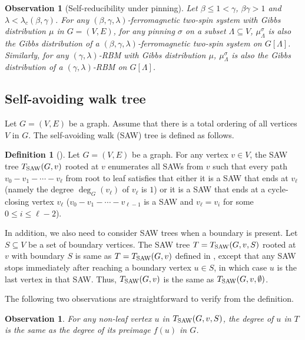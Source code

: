 \documentclass[11pt]{amsart}
\newtheorem{observation}[theorem]{Observation}
\theoremstyle{definition}
\newtheorem{definition}[theorem]{Definition}
\theoremstyle{remark}
\begin{document}
\begin{observation}[Self-reducibility under pinning]\label{obs:self-reducibility}
  Let $\beta \leq 1 < \gamma$, $\beta\gamma > 1$ and $\lambda < \lambda_c(\beta,\gamma)$. For any $(\beta,\gamma,\lambda)$-ferromagnetic two-spin system with Gibbs distribution $\mu$ in $G=(V,E)$, for any pinning $\sigma$ on a subset $\Lambda \subseteq V$, $\mu^\sigma_\Lambda$ is also the Gibbs distribution of a $(\beta,\gamma,\lambda)$-ferromagnetic two-spin system on $G[\Lambda]$. 
  Similarly, for any $(\gamma,\lambda)$-RBM with Gibbs distribution $\mu$, $\mu^\sigma_\Lambda$ is also the Gibbs distribution of a $(\gamma,\lambda)$-RBM on $G[\Lambda]$.
\end{observation}




\subsection{Self-avoiding walk tree}\label{sec:saw-tree}
Let $G = (V,E)$ be a graph.
Assume that there is a total ordering of all vertices $V$ in $G$.
The self-avoiding walk (SAW) tree is defined as follows.
\begin{definition}[]\label{def:saw-tree}
 Let $G=(V,E)$ be a graph. For any vertex $v\in V$, the SAW tree $T_{\textnormal{SAW}}(G,v)$ rooted at $v$ enumerates all SAWs from $v$ such that every path $v_0-v_1-\cdots-v_\ell$ from root to leaf satisfies that either it is a SAW that ends at $v_\ell$ (namely the degree $\deg_G(v_\ell)$ of $v_\ell$ is $1$) or it is a SAW that ends at a cycle-closing vertex $v_\ell$ ($v_0-v_1-\cdots-v_{\ell-1}$ is a SAW and $v_\ell = v_i$ for some $0\leq i \leq \ell - 2$).%
\end{definition}

In addition, we also need to consider SAW trees when a boundary is present.
Let $S\subseteq V$ be a set of boundary vertices.
The SAW tree $T = T_{\textnormal{SAW}}(G,v,S)$ rooted at $v$ with boundary $S$ is same as $T = T_{\textnormal{SAW}}(G,v)$ defined in ,
except that any SAW stops immediately after reaching a boundary vertex $u \in S$, in which case $u$ is the last vertex in that SAW.
Thus, $ T_{\textnormal{SAW}}(G,v)$ is the same as $ T_{\textnormal{SAW}}(G,v,\emptyset)$.

The following two observations are straightforward to verify from the definition.
\begin{observation}\label{obs:non-leaf-vertices-in-saw-tree}
  For any non-leaf vertex $u$ in $T_{\textnormal{SAW}}(G,v,S)$, the degree of $u$ in $T$ is the same as the degree of its preimage $f(u)$ in $G$. %
\end{observation}
\end{document}
